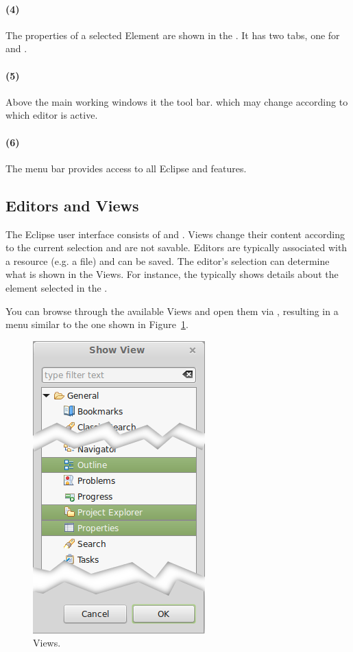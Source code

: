 \paragraph{(4)} The properties of a selected Element are shown in the .  It has two tabs, one for  and .

\paragraph{(5)} Above the main working windows it the tool bar. which may change according to which editor is active.

\paragraph{(6)} The menu bar provides access to all Eclipse and \pror{} features.

\subsection{Editors and Views}

The Eclipse user interface consists of  and .  Views change their content according to the current selection and are not savable.  Editors are typically associated with a resource (e.g. a file) and can be saved.  The editor's selection can determine what is shown in the Views.  For instance, the  typically shows details about the element selected in the .

You can browse through the available Views and open them via , resulting in a menu similar to the one shown in Figure~\ref{fig:Views}.

\begin{figure}
\centering
\includegraphics[width=.3\textwidth]{../rmf-images/views_highlighted.png}
\caption{Views.}
\label{fig:Views}
\end{figure}

